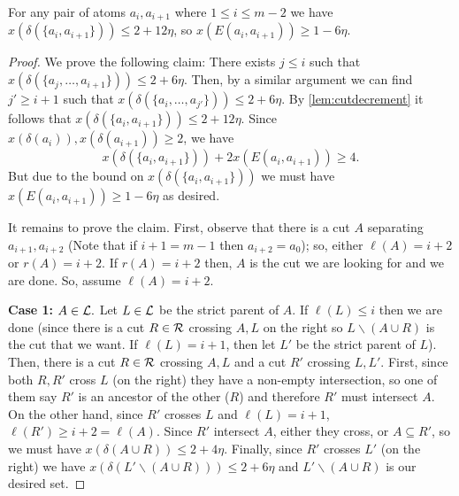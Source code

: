 \begin{lemma}\label{lem:polygonedgesarebig}
For any pair of atoms $a_i,a_{i+1}$ where $1\leq i\leq m-2$ we have $x(\delta(\{a_i,a_{i+1}\}))\leq 2+12\eta$, so $x(E(a_i,a_{i+1}))\geq 1-6\eta$.	
\end{lemma}
\begin{proof}
We prove the following claim: There exists $j\leq i$ such that $x(\delta(\{a_j,\dots,a_{i+1}\}))\leq 2+6\eta$. 
Then, by a similar argument we can find $j'\geq i+1$ such that $x(\delta(\{a_i,\dots,a_{j'}\}))\leq 2+6\eta$. By \cref{lem:cutdecrement} it follows that $x(\delta(\{a_i,a_{i+1}\}))\leq 2+12\eta$. Since $x(\delta(a_i)),x(\delta(a_{i+1}))\geq 2$, we have
$$x(\delta(\{a_i,a_{i+1}\})) + 2x(E(a_i,a_{i+1})) \ge 4.$$
But due to the bound on $x(\delta(\{a_i,a_{i+1}\}))$ we must have $x(E(a_i,a_{i+1}))\geq 1-6\eta$ as desired.


It remains to prove the claim. 	
First, observe that there is a cut $A$ separating $a_{i+1},a_{i+2}$ (Note that if $i+1=m-1$ then  $a_{i+2}=a_0$); so, either $\ell(A)=i+2$ or $r(A)=i+2$. If $r(A)=i+2$ then, $A$ is the cut we are looking for and we are done. So, assume $\ell(A)=i+2$. 

{\bf Case 1: $A\in {\cal L}.$}
Let $L\in {\cal L}$ be the strict parent of $A$. If $\ell(L)\leq i$ then we are done (since there is a cut $R\in{\mathcal{R}}$ crossing $A,L$ on the right so $L\smallsetminus (A\cup R)$ is the cut that we want. If $\ell(L)=i+1$, then let $L'$ be the strict parent of $L$).
Then, there is a cut $R\in{\mathcal{R}}$ crossing $A,L$ and a cut 
$R'$ crossing $L,L'$. 
First, since both $R,R'$ cross $L$ (on the right) they have a non-empty intersection, so one of them say $R'$ is an ancestor of the other ($R$) and therefore $R'$ must intersect $A$.
On the other hand, since $R'$ crosses $L$ and $\ell(L)=i+1$, $\ell(R')\geq i+2=\ell(A)$. Since $R'$ intersect $A$, either they cross, or $A\subseteq R'$, so we must have $x(\delta(A\cup R))\leq 2+4\eta$.
Finally, since $R'$ crosses $L'$ (on the right) we have $x(\delta (L' \smallsetminus (A \cup R))) \le 2 + 6 \eta$ and $L'\smallsetminus (A\cup R)$ is our desired set.





\end{proof}
